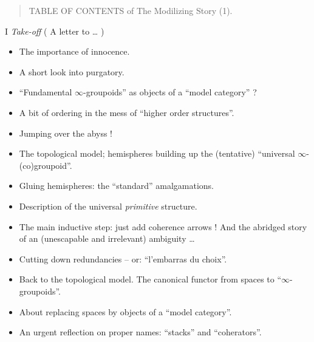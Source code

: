 \documentclass[11pt,a4paper]{article}
\begin{document}

\begin{quote}
TABLE OF CONTENTS of The Modilizing Story (1).
\end{quote}


I \emph{Take-off} ( A letter to … )
\begin{itemize}
  \item[1.] The importance of innocence.
  \item[2.] A short look into purgatory.
  \item[3.] ``Fundamental $\infty$-groupoids'' as objects of a ``model category'' ?
  \item[4.] A bit of ordering in the mess of ``higher order structures''.
  \item[5.] Jumping over the abyss !
  \item[6.] The topological model; hemispheres building up the (tentative) ``universal $\infty$-(co)groupoid''.
  \item[7.] Gluing hemispheres: the ``standard'' amalgamations.
  \item[8.] Description of the universal \emph{primitive} structure.
  \item[9.] The main inductive step: just add coherence arrows ! And the abridged story of an (unescapable and irrelevant) ambiguity …
  \item[10.] Cutting down redundancies -- or: ``l'embarras du choix''.
  \item[11.] Back to the topological model. The canonical functor from spaces to ``$\infty$-groupoids''.
  \item[12.] About replacing spaces by objects of a ``model category''.
  \item[13.] An urgent reflection on proper names: ``stacks'' and ``coherators''.
\end{itemize}
\end{document}
